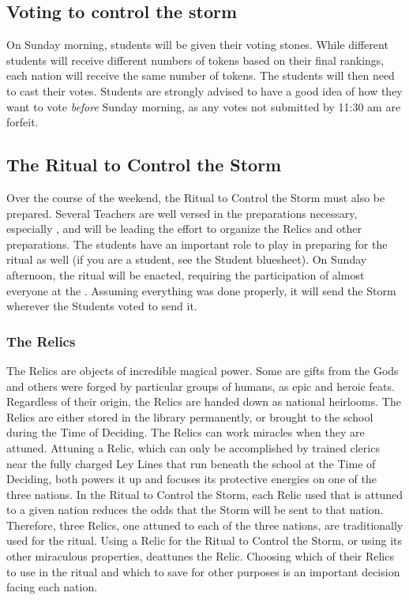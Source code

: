 \documentclass[blue]{GL2020}
\begin{document}
\subsection*{Voting to control the storm}
On Sunday morning, students will be given their voting stones. While different students will receive different numbers of tokens based on their final rankings, each nation will receive the same number of tokens. The students will then need to cast their votes. Students are strongly advised to have a good idea of how they want to vote \emph{before} Sunday morning, as any votes not submitted by 11:30 am are forfeit.

\subsection*{The Ritual to Control the Storm}
Over the course of the weekend, the Ritual to Control the Storm must also be prepared. Several Teachers are well versed in the preparations necessary, especially \cLibrarian{\full}, and will be leading the effort to organize the Relics and other preparations. The students have an important role to play in preparing for the ritual as well (if you are a student, see the Student bluesheet). On Sunday afternoon, the ritual will be enacted, requiring the participation of almost everyone at the \pSchool{}. Assuming everything was done properly, it will send the Storm wherever the Students voted to send it.

\subsubsection*{The Relics}
The Relics are objects of incredible magical power. Some are gifts from the Gods and others were forged by particular groups of humans, as epic and heroic feats. Regardless of their origin, the Relics are handed down as national heirlooms. The Relics are either stored in the \pSchool{} library permanently, or brought to the school during the Time of Deciding. The Relics can work miracles when they are attuned. Attuning a Relic, which can only be accomplished by trained clerics near the fully charged Ley Lines that run beneath the school at the Time of Deciding, both powers it up and focuses its protective energies on one of the three nations. In the Ritual to Control the Storm, each Relic used that is attuned to a given nation reduces the odds that the Storm will be sent to that nation. Therefore, three Relics, one attuned to each of the three nations, are traditionally used for the ritual. Using a Relic for the Ritual to Control the Storm, or using its other miraculous properties, deattunes the Relic. Choosing which of their Relics to use in the ritual and which to save for other purposes is an important decision facing each nation. 
\end{document}
